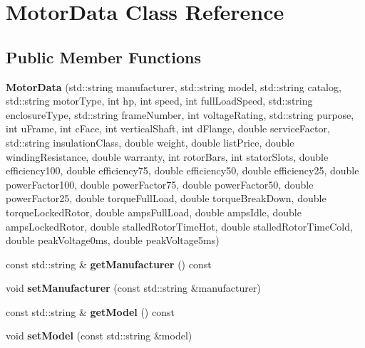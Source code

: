\hypertarget{class_motor_data}{}\section{Motor\+Data Class Reference}
\label{class_motor_data}
\subsection*{Public Member Functions}
\begin{DoxyCompactItemize}
\item 
\mbox{\label{class_motor_data_aebca34509f0587da9fe3d488aba3a94e}} 
{\bfseries Motor\+Data} (std\+::string manufacturer, std\+::string model, std\+::string catalog, std\+::string motor\+Type, int hp, int speed, int full\+Load\+Speed, std\+::string enclosure\+Type, std\+::string frame\+Number, int voltage\+Rating, std\+::string purpose, int u\+Frame, int c\+Face, int vertical\+Shaft, int d\+Flange, double service\+Factor, std\+::string insulation\+Class, double weight, double list\+Price, double winding\+Resistance, double warranty, int rotor\+Bars, int stator\+Slots, double efficiency100, double efficiency75, double efficiency50, double efficiency25, double power\+Factor100, double power\+Factor75, double power\+Factor50, double power\+Factor25, double torque\+Full\+Load, double torque\+Break\+Down, double torque\+Locked\+Rotor, double amps\+Full\+Load, double amps\+Idle, double amps\+Locked\+Rotor, double stalled\+Rotor\+Time\+Hot, double stalled\+Rotor\+Time\+Cold, double peak\+Voltage0ms, double peak\+Voltage5ms)
\item 
\mbox{\label{class_motor_data_ac82670f7d61f55418eebf6766b85c356}} 
const std\+::string \& {\bfseries get\+Manufacturer} () const
\item 
\mbox{\label{class_motor_data_a3bd37613532ae8c3ca1f40d474af75a2}} 
void {\bfseries set\+Manufacturer} (const std\+::string \&manufacturer)
\item 
\mbox{\label{class_motor_data_a0add720aadf3e154c97890836d9a92e5}} 
const std\+::string \& {\bfseries get\+Model} () const
\item 
\mbox{\label{class_motor_data_a8d5385d24308d0627f7840ecfe2e6513}} 
void {\bfseries set\+Model} (const std\+::string \&model)

\end{DoxyCompactItemize}
